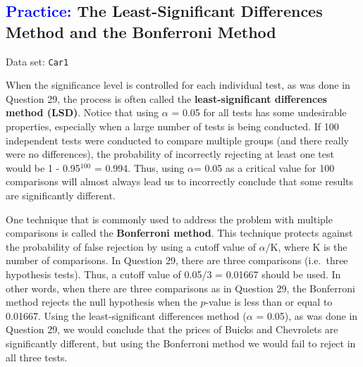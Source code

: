 \documentclass[
]{report}
\begin{document}
\hypertarget{the-least-significant-differences-method-and-the-bonferroni-method}{%
\subsection*{\texorpdfstring{\textcolor{blue}{Practice:} The Least-Significant Differences Method and the Bonferroni Method}{ The Least-Significant Differences Method and the Bonferroni Method}}\label{the-least-significant-differences-method-and-the-bonferroni-method}}

\vspace{-1em}

Data set: \texttt{Car1}

When the significance level is controlled for each individual test, as was done in Question 29, the process is often called the \textbf{least-significant differences method (LSD)}. Notice that using \(\scriptstyle \alpha\) = 0.05 for all tests has some undesirable properties, especially when a large number of tests is being conducted. If 100 independent tests were conducted to compare multiple groups (and there really were no differences), the probability of incorrectly rejecting at least one test would be 1 - 0.95\(^{100}\) = 0.994. Thus, using \(\scriptstyle \alpha\)= 0.05 as a critical value for 100 comparisons will almost always lead us to incorrectly conclude that some results are significantly different.

One technique that is commonly used to address the problem with multiple comparisons is called the \textbf{Bonferroni method}. This technique protects against the probability of false rejection by using a cutoff value of \(\scriptstyle \alpha\)/K, where K is the number of comparisons. In Question 29, there are three comparisons (i.e.~three hypothesis tests). Thus, a cutoff value of 0.05/3 = 0.01667 should be used. In other words, when there are three comparisons as in Question 29, the Bonferroni method rejects the null hypothesis when the \(\scriptstyle p\)-value is less than or equal to 0.01667. Using the least-significant differences method (\(\scriptstyle \alpha\) = 0.05), as was done in Question 29, we would conclude that the prices of Buicks and Chevrolets are significantly different, but using the Bonferroni method we would fail to reject in all three tests.
\end{document}
